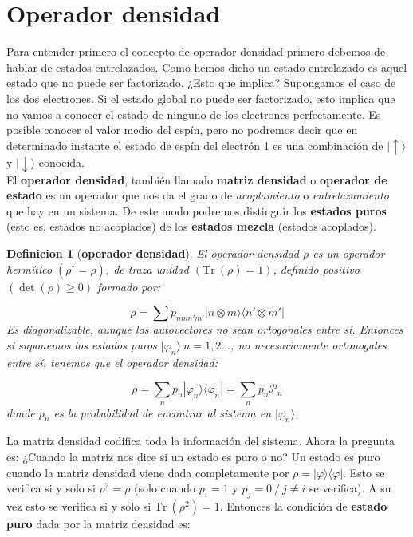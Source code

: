 \documentclass[12pt]{book}
\numberwithin{equation}{chapter}
\numberwithin{figure}{chapter}
\newcommand{\Tr}{\mathrm{Tr} \ }
\newcommand{\eup}{\mid \uparrow \rangle}
\newcommand{\edw}{\mid \downarrow \rangle}
\newtheorem{definition}{Definicion}[section]
\begin{document}
\section{Operador densidad}

Para entender primero el concepto de operador densidad primero debemos de hablar de estados entrelazados. Como hemos dicho un estado entrelazado es aquel estado que no puede ser factorizado. ¿Esto que implica? Supongamos el caso de los dos electrones. Si el estado global no puede ser factorizado, esto implica que no vamos a conocer el estado de ninguno de los electrones perfectamente. Es posible conocer el valor medio del espín, pero no podremos decir que en determinado instante el estado de espín del electrón 1 es una combinación de $\eup$ y $\edw$ conocida. \\

El \textbf{operador densidad}, también llamado \textbf{matriz densidad} o \textbf{operador de estado} es un operador que nos da el grado de \textit{acoplamiento} o \textit{entrelazamiento} que hay en un sistema. De este modo podremos distinguir los \textbf{estados puros} (esto es, estados no acoplados) de los \textbf{estados mezcla} (estados acoplados). \\

\begin{definition}[\textbf{operador densidad}]
El operador densidad $\rho$ es un operador hermítico $( \rho^\dagger = \rho)$, de traza unidad $(\Tr (\rho) = 1)$, definido positivo $(\det (\rho) \geq 0)$ formado por:

\begin{equation}
\rho = \sum p_{nmn'm'} |n \otimes m \rangle \langle n' \otimes m' |
\end{equation}
Es diagonalizable, aunque los autovectores no sean ortogonales entre sí. Entonces si suponemos los estados puros $|\varphi_n \rangle \ n=1,2...$, no necesariamente ortonogales entre sí, tenemos que el operador densidad:

\begin{equation}
\rho = \sum_ n p_n |\varphi_n \rangle \langle \varphi_n | = \sum_n p_n \mathcal{P}_n
\end{equation}
donde $p_n$ es la probabilidad de encontrar al sistema en $|\varphi_n \rangle$. 
\end{definition}

La matriz densidad codifica toda la información del sistema. Ahora la pregunta es: ¿Cuando la matriz nos dice si un estado es puro o no? Un estado es puro cuando la matriz densidad viene dada completamente por $\rho = |\varphi \rangle \langle \varphi |$. Esto se verifica si y solo si $\rho^2 = \rho$ (solo cuando $p_i=1$ y $p_j = 0 \ / \ j\neq i$ se verifica). A su vez esto se verifica si y solo si $\Tr (\rho^2) = 1$. Entonces la condición de \textbf{estado puro} dada por la matriz densidad es:
\end{document}

